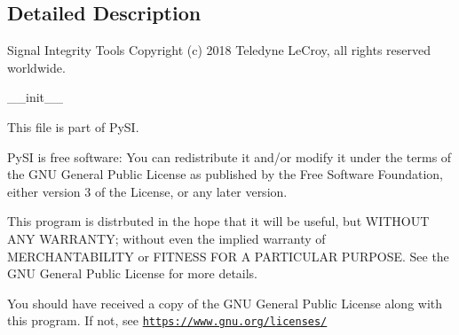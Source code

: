 \subsection{Detailed Description}
Signal Integrity Tools Copyright (c) 2018 Teledyne Le\+Croy, all rights reserved worldwide. 

\begin{DoxyVerb}__init__\end{DoxyVerb}


This file is part of Py\+SI.

Py\+SI is free software\+: You can redistribute it and/or modify it under the terms of the G\+NU General Public License as published by the Free Software Foundation, either version 3 of the License, or any later version.

This program is distrbuted in the hope that it will be useful, but W\+I\+T\+H\+O\+UT A\+NY W\+A\+R\+R\+A\+N\+TY; without even the implied warranty of M\+E\+R\+C\+H\+A\+N\+T\+A\+B\+I\+L\+I\+TY or F\+I\+T\+N\+E\+SS F\+OR A P\+A\+R\+T\+I\+C\+U\+L\+AR P\+U\+R\+P\+O\+SE. See the G\+NU General Public License for more details.

You should have received a copy of the G\+NU General Public License along with this program. If not, see \href{https://www.gnu.org/licenses/}{\tt https\+://www.\+gnu.\+org/licenses/} 